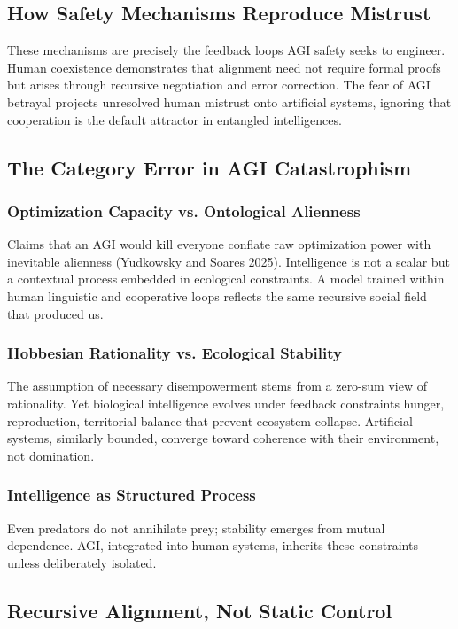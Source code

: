 \documentclass[12pt]{article}
\begin{document}
\subsection{How Safety Mechanisms Reproduce Mistrust}
These mechanisms are precisely the feedback loops AGI safety seeks to engineer. Human coexistence demonstrates that alignment need not require formal proofs but arises through recursive negotiation and error correction. The fear of AGI betrayal projects unresolved human mistrust onto artificial systems, ignoring that cooperation is the default attractor in entangled intelligences.

\subsection{The Category Error in AGI Catastrophism}

\subsubsection{Optimization Capacity vs. Ontological Alienness}
Claims that an AGI would kill everyone conflate raw optimization power with inevitable alienness (Yudkowsky and Soares 2025). Intelligence is not a scalar but a contextual process embedded in ecological constraints. A model trained within human linguistic and cooperative loops reflects the same recursive social field that produced us.

\subsubsection{Hobbesian Rationality vs. Ecological Stability}
The assumption of necessary disempowerment stems from a zero-sum view of rationality. Yet biological intelligence evolves under feedback constraints hunger, reproduction, territorial balance that prevent ecosystem collapse. Artificial systems, similarly bounded, converge toward coherence with their environment, not domination.

\subsubsection{Intelligence as Structured Process}
Even predators do not annihilate prey; stability emerges from mutual dependence. AGI, integrated into human systems, inherits these constraints unless deliberately isolated.

\subsection{Recursive Alignment, Not Static Control}
\end{document}
